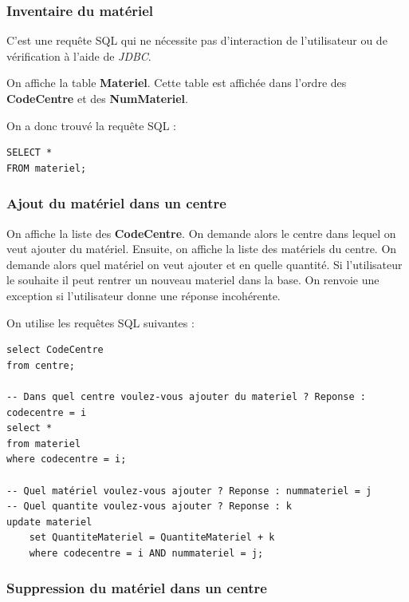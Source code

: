 \documentclass[10pt]{article}
\begin{document}
\subsubsection{Inventaire du matériel}

C'est une requête SQL qui ne nécessite pas d'interaction de l'utilisateur ou de vérification à l'aide de \emph{JDBC}.

On affiche la table \textbf{Materiel}. Cette table est affichée dans l'ordre des \textbf{CodeCentre} et des \textbf{NumMateriel}.

On a donc trouvé la requête SQL :
\begin{small}
\begin{verbatim}
SELECT *
FROM materiel;
\end{verbatim}
\end{small}

\subsubsection{Ajout du matériel dans un centre}

On affiche la liste des \textbf{CodeCentre}. On demande alors le centre dans lequel on veut ajouter du matériel. Ensuite,
on affiche la liste des matériels du centre. On demande alors quel matériel on veut ajouter et en quelle quantité. Si l'utilisateur le souhaite il peut rentrer un nouveau materiel dans la base.  On renvoie une exception si l'utilisateur donne une réponse incohérente.

On utilise les requêtes SQL suivantes :

\begin{small}
\begin{verbatim}
select CodeCentre
from centre;

-- Dans quel centre voulez-vous ajouter du materiel ? Reponse : codecentre = i
select *
from materiel 
where codecentre = i;

-- Quel matériel voulez-vous ajouter ? Reponse : nummateriel = j
-- Quel quantite voulez-vous ajouter ? Reponse : k
update materiel
	set QuantiteMateriel = QuantiteMateriel + k
	where codecentre = i AND nummateriel = j;
\end{verbatim}
\end{small}

\subsubsection{Suppression du matériel dans un centre}
\end{document}
